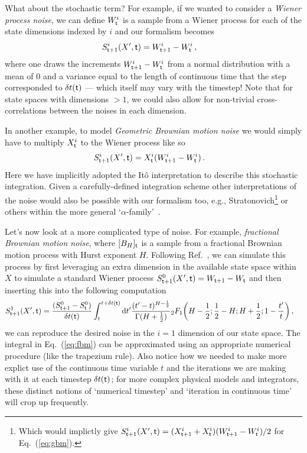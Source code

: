 \documentclass{book}
\begin{document}
What about the stochastic term? For example, if we wanted to consider a \emph{Wiener process noise}, we can define $W^i_{{\sf t}}$ is a sample from a Wiener process for each of the state dimensions indexed by $i$ and our formalism becomes
\begin{align}
& S^{i}_{{\sf t}+1}(X',{\sf t}) =  W^i_{{\sf t}+1}-W^i_{\sf t} \label{eq:wiener}\,,
\end{align}
where one draws the increments $W^i_{{\sf t}+1}-W^i_{\sf t}$ from a normal distribution with a mean of $0$ and a variance equal to the length of continuous time that the step corresponded to $\delta t({\sf t})$ --- which itself may vary with the timestep! Note that for state spaces with dimensions $>1$, we could also allow for non-trivial cross-correlations between the noises in each dimension.

In another example, to model \emph{Geometric Brownian motion noise} we would simply have to multiply $X^i_{\sf t}$ to the Wiener process like so
\begin{align}
& S^{i}_{{\sf t}+1}(X',{\sf t}) = X^i_{\sf t}(W^i_{{\sf t}+1}-W^i_{\sf t})\label{eq:gbm} \,.
\end{align}
Here we have implicitly adopted the Itô interpretation to describe this stochastic integration. Given a carefully-defined integration scheme other interpretations of the noise would also be possible with our formalism too, e.g., Stratonovich\footnote{Which would implictly give $S^{i}_{{\sf t}+1}(X',{\sf t}) = (X^i_{{\sf t}+1}+X^i_{\sf t})(W^i_{{\sf t}+1}-W^i_{\sf t}) / 2$ for Eq.~(\ref{eq:gbm}).} or others within the more general `$\alpha$-family'~\cite{van1992stochastic,risken1996fokker,rog-will-2000}.

Let's now look at a more complicated type of noise. For example, \emph{fractional Brownian motion noise}, where $[B_{H}]_{\sf t}$ is a sample from a fractional Brownian motion process with Hurst exponent $H$. Following Ref.~\cite{decreusefond1999stochastic}, we can simulate this process by first leveraging an extra dimension in the available state space within $X$ to simulate a standard Wiener process $S^{0}_{{\sf t}+1}(X',{\sf t}) = W_{{\sf t}+1} - W_{\sf t}$ and then inserting this into the following computation
\begin{align}
S^{1}_{{\sf t}+1}(X',{\sf t}) &= \frac{(S^{0}_{{\sf t}+1} - S^{0}_{\sf t})}{\delta t({\sf t})}\int^{t+\delta t({\sf t})}_{t}{\rm d}t' \frac{(t'-t)^{H-\frac{1}{2}}}{\Gamma (H+\frac{1}{2})} {}_2F_1 \bigg( H-\frac{1}{2};\frac{1}{2}-H;H+\frac{1}{2};1-\frac{t'}{t}\bigg) \label{eq:fbm} \,,
\end{align}
we can reproduce the desired noise in the $i=1$ dimension of our state space. The integral in Eq.~(\ref{eq:fbm}) can be approximated using an appropriate numerical procedure (like the trapezium rule). Also notice how we needed to make more explict use of the continuous time variable $t$ and the iterations we are making with it at each timestep $\delta t({\sf t})$; for more complex physical models and integrators, these distinct notions of `numerical timestep' and `iteration in continuous time' will crop up frequently.
\end{document}
